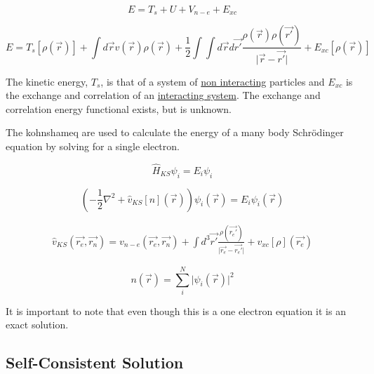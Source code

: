 \begin{equation}
E = T_{s} + U + V_{n-e} + E_{xc}
\end{equation}

\begin{equation}
E = T_{s}[\rho(\vec{r})] + \int d \vec{r} v(\vec{r}) \rho(\vec{r}) + \frac{1}{2} \int \int  d \vec{r} d \vec{r'} \frac{\rho(\vec{r}) \rho(\vec{r'}) }{\lvert \vec{r} - \vec{r'} \rvert} + E_{xc}[\rho(\vec{r})]
\end{equation}

The kinetic energy, $T_s$, is that of a system of \underline{non interacting} particles and $E_{xc}$ is the exchange and correlation of an \underline{interacting system}.  The exchange and correlation energy functional exists, but is unknown.  

The \Gls{kohnshameq} are used to calculate the energy of a many body Schr\"{o}dinger equation by solving for a single electron.

\begin{equation}
\hat{H}_{KS} \psi_{i} = E_{i} \psi_{i}
\label{eq:eqKS1}
\end{equation}

\begin{equation}
\left(-\frac{1}{2} \nabla^2 + \hat{v}_{KS}[n](\vec{r}) \right) \psi_{i}(\vec{r}) = E_{i} \psi_{i}(\vec{r})
\label{eq:eqKS2}
\end{equation}

\begin{equation}
\begin{split}
\hat{v}_{KS}(\vec{r_e}, \vec{r_n}) = v_{n-e}(\vec{r_e}, \vec{r_n}) + \int d^3\vec{r'} \frac{\rho(\vec{r_{e}'})}{\lvert \vec{r_{e}} - \vec{r_{e}'} \rvert } + v_{xc}[\rho](\vec{r_{e}})
\end{split}
\label{eq:eqGroundState}
\end{equation}

\begin{equation}
n(\vec{r}) = \sum_i^N \lvert \psi_{i}(\vec{r}) \lvert^2
\label{eq:eqKS2b}
\end{equation}



It is important to note that even though this is a one electron equation it is an exact solution.


\subsection{Self-Consistent Solution}
\FloatBarrier

